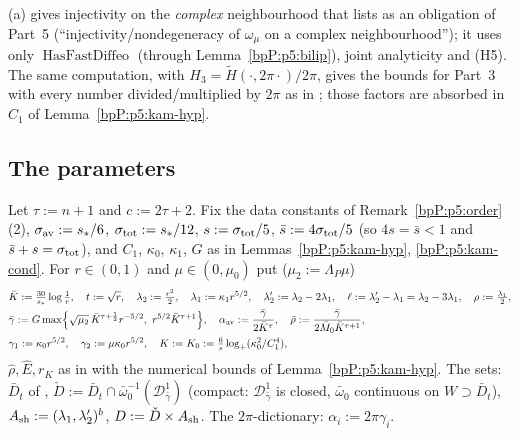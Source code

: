 \begin{remark}\label{bpP:p5:freq-inj-rem}
(a) gives injectivity on the \emph{complex} neighbourhood that  lists as an obligation of Part~5 (``injectivity/nondegeneracy of $\omega_\mu$ on a complex neighbourhood''); it uses only $\operatorname{HasFastDiffeo}$ (through Lemma~\ref{bpP:p5:bilip}), joint analyticity and (H5). The same computation, with $H_3=\tilde H(\cdot,2\pi\cdot)/2\pi$, gives the bounds for Part~3 with every number divided/multiplied by $2\pi$ as in ; those factors are absorbed in $C_1$ of Lemma~\ref{bpP:p5:kam-hyp}.
\end{remark}

\subsection{The parameters}\label{bpP:p5:parameters}

\begin{definition}\label{bpP:p5:params}
Let $\tau:=n+1$ and $c:=2\tau+2$. Fix the data constants of Remark~\ref{bpP:p5:order}\,(2), $\sigma_{\rm av}:=s_*/6$, $\sigma_{\rm tot}:=s_*/12$, $s:=\sigma_{\rm tot}/5$, $\bar s:=4\sigma_{\rm tot}/5$ (so $4s=\bar s<1$ and $\bar s+s=\sigma_{\rm tot}$), and $C_1$, $\kappa_0$, $\kappa_1$, $G$ as in Lemmas~\ref{bpP:p5:kam-hyp}, \ref{bpP:p5:kam-cond}. For $r\in(0,1)$ and $\mu\in(0,\mu_0)$ put ($\mu_2:=\Lambda_P\mu$)
\begin{align*}
&\bar K:=\tfrac{30}{s_*}\log\tfrac1r,\quad t:=\sqrt r,\quad\lambda_2:=\tfrac{r^2}2,\quad\lambda_1:=\kappa_1r^{5/2},\quad\lambda_2':=\lambda_2-2\lambda_1,\quad\ell:=\lambda_2'-\lambda_1=\lambda_2-3\lambda_1,\quad\rho:=\tfrac{\lambda_1}2,\\
&\bar\gamma:=G\max\Bigl\{\sqrt{\mu_2}\,\bar K^{\tau+\frac12}r^{-5/2},\ r^{5/2}\bar K^{\tau+1}\Bigr\},\quad\alpha_{\rm av}:=\frac{\bar\gamma}{2\bar K^\tau},\quad\bar\rho:=\frac{\bar\gamma}{2\bar M_0\bar K^{\tau+1}},\\
&\gamma_1:=\kappa_0r^{5/2},\quad\gamma_2:=\mu\kappa_0r^{5/2},\quad K:=K_0:=\tfrac6s\log_+(\kappa_0^2/C_1^4),
\end{align*}
$\hat\rho,\hat E,r_K$ as in  with the numerical bounds of Lemma~\ref{bpP:p5:kam-hyp}. The sets: $\bar D_t$ of , $\check D:=\bar D_t\cap\bar\omega_0^{-1}(\mathcal D^1_{\bar\gamma})$ (compact: $\mathcal D^1_{\bar\gamma}$ is closed, $\bar\omega_0$ continuous on $W\supset\bar D_t$), $A_{\rm sh}:=(\lambda_1,\lambda_2')^b$, $D:=\check D\times A_{\rm sh}$. The $2\pi$-dictionary: $\alpha_i:=2\pi\gamma_i$.
\end{definition}

